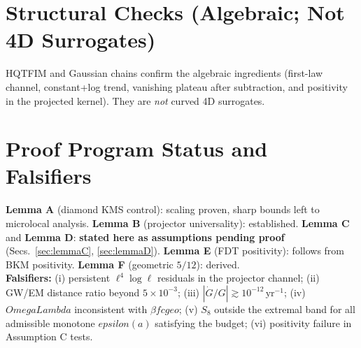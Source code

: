 \documentclass[aps,prd,onecolumn,superscriptaddress,nofootinbib]{revtex4-2}
\def\OmL{OmegaLambda}%
\def\cgeo{cgeo}%
\def\eps{epsilon}%
\def\Omega_\Lambda{OmegaLambda}%
\providecommand{\OmL}{\Omega_\Lambda}
\providecommand{\cgeo}{c_{\rm geo}}
\providecommand{\eps}{\varepsilon}
\begin{document}
\section{Structural Checks (Algebraic; Not 4D Surrogates)}
\label{sec:substrates}
HQTFIM and Gaussian chains confirm the algebraic ingredients (first-law channel, constant+log trend, vanishing plateau after subtraction, and positivity in the projected kernel). They are \emph{not} curved 4D surrogates.

\section{Proof Program Status and Falsifiers}
\label{sec:program}
\textbf{Lemma A} (diamond KMS control): scaling proven, sharp bounds left to microlocal analysis. \textbf{Lemma B} (projector universality): established. \textbf{Lemma C} and \textbf{Lemma D}: \textbf{stated here as assumptions pending proof} (Secs.~\ref{sec:lemmaC}, \ref{sec:lemmaD}). \textbf{Lemma E} (FDT positivity): follows from BKM positivity. \textbf{Lemma F} (geometric \(5/12\)): derived.\\
\textbf{Falsifiers:} (i) persistent \(\ell^4\log\ell\) residuals in the projector channel; (ii) GW/EM distance ratio beyond \(5\times 10^{-3}\); (iii) \(|\dot G/G|\gtrsim 10^{-12}\,\mathrm{yr}^{-1}\); (iv) \(\OmL\) inconsistent with \(\beta f\cgeo\); (v) \(S_8\) outside the extremal band for all admissible monotone \(\eps(a)\) satisfying the budget; (vi) positivity failure in Assumption C tests.

\end{document}
